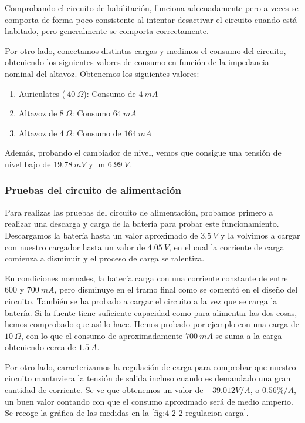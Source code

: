 Comprobando el circuito de habilitación, funciona adecuadamente pero a veces se comporta de forma poco consistente al intentar desactivar el circuito cuando está habitado, pero generalmente se comporta correctamente. 

Por otro lado, conectamos distintas cargas y medimos el consumo del circuito, obteniendo los siguientes valores de consumo en función de la impedancia nominal del altavoz. Obtenemos los siguientes valores:
\begin{enumerate}
    \item Auriculates ($~40\ \Omega$): Consumo de $4\ mA$
    \item Altavoz de $8\ \Omega$: Consumo $64\ mA$
    \item Altavoz de $4\ \Omega$: Consumo de $164\ mA$
\end{enumerate}

Además, probando el cambiador de nivel, vemos que consigue una tensión de nivel bajo de $19.78\ mV$ y un $6.99\ V$.

\subsubsection{Pruebas del circuito de alimentación}

Para realizas las pruebas del circuito de alimentación, probamos primero a realizar una descarga y carga de la batería para probar este funcionamiento. Descargamos la batería hasta un valor aproximado de $3.5\ V$ y la volvimos a cargar con nuestro cargador hasta un valor de $4.05\ V$, en el cual la corriente de carga comienza a disminuir y el proceso de carga se ralentiza.

En condiciones normales, la batería carga con una corriente constante de entre $600$ y $700\ mA$, pero disminuye en el tramo final como se comentó en el diseño del circuito. También se ha probado a cargar el circuito a la vez que se carga la batería. Si la fuente tiene suficiente capacidad como para alimentar las dos cosas, hemos comprobado que así lo hace. Hemos probado por ejemplo con una carga de $10\ \Omega$, con lo que el consumo de aproximadamente $
700\ mA$ se suma a la carga obteniendo cerca de $1.5\ A$.

Por otro lado, caracterizamos la regulación de carga para comprobar que nuestro circuito mantuviera la tensión de salida incluso cuando es demandado una gran cantidad de corriente. Se ve que obtenemos un valor de $-39.012 V/A$, o $0.56\%/A$, un buen valor contando con que el consumo aproximado será de medio amperio. Se recoge la gráfica de las medidas en la \autoref{fig:4-2-2-regulacion-carga}.

